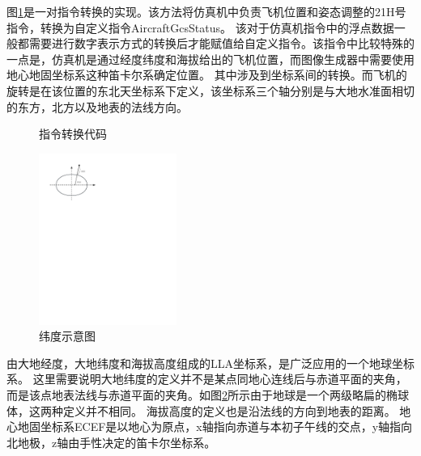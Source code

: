 \par
图\ref{21convert}是一对指令转换的实现。该方法将仿真机中负责飞机位置和姿态调整的21H号指令，转换为自定义指令AircraftGcsStatus。
该对于仿真机指令中的浮点数据一般都需要进行数字表示方式的转换后才能赋值给自定义指令。该指令中比较特殊的一点是，仿真机是通过经度纬度和海拔给出的飞机位置，而图像生成器中需要使用地心地固坐标系这种笛卡尔系确定位置。
其中涉及到坐标系间的转换。而飞机的旋转是在该位置的东北天坐标系下定义，该坐标系三个轴分别是与大地水准面相切的东方，北方以及地表的法线方向。
\begin{figure}[h!]
    \begin{center}
        
        \caption{指令转换代码}
        \label{21convert}
    \end{center}
\end{figure}
\begin{figure}[h!]
    \begin{center}
        \includegraphics[width=0.4\textwidth]{pictures/latitude.pdf}
        \caption{纬度示意图}
        \label{latitude}
    \end{center}
\end{figure}
\par
由大地经度，大地纬度和海拔高度组成的LLA坐标系，是广泛应用的一个地球坐标系。
这里需要说明大地纬度的定义并不是某点同地心连线后与赤道平面的夹角，而是该点地表法线与赤道平面的夹角。如图\ref{latitude}所示由于地球是一个两级略扁的椭球体，这两种定义并不相同。
海拔高度的定义也是沿法线的方向到地表的距离。
地心地固坐标系ECEF是以地心为原点，x轴指向赤道与本初子午线的交点，y轴指向北地极，z轴由手性决定的笛卡尔坐标系。

